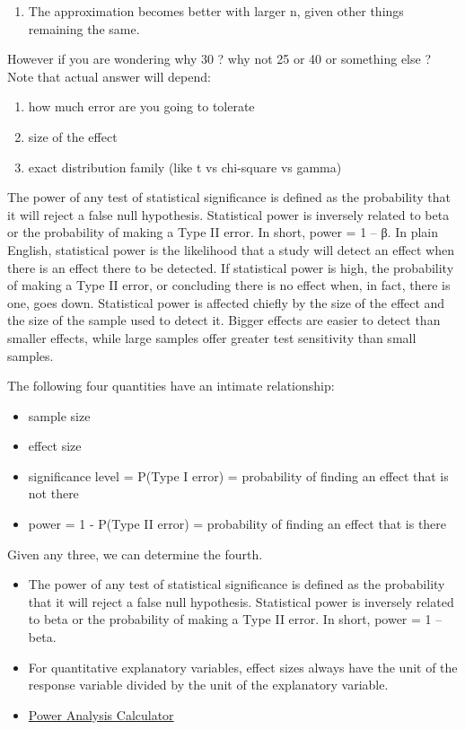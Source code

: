 \documentclass[]{book}
\providecommand{\tightlist}{%
  \setlength{\itemsep}{0pt}\setlength{\parskip}{0pt}}
\begin{document}
\begin{enumerate}
\def\labelenumi{\arabic{enumi})}
\setcounter{enumi}{1}
\tightlist
\item
  The approximation becomes better with larger n, given other things remaining the same.
\end{enumerate}

However if you are wondering why 30 ? why not 25 or 40 or something else ? Note that actual answer will depend:

\begin{enumerate}
\def\labelenumi{\arabic{enumi})}
\item
  how much error are you going to tolerate
\item
  size of the effect
\item
  exact distribution family (like t vs chi-square vs gamma)
\end{enumerate}

The power of any test of statistical significance is defined as the probability that it will reject a false null hypothesis. Statistical power is inversely related to beta or the probability of making a Type II error. In short, power = 1 -- β. In plain English, statistical power is the likelihood that a study will detect an effect when there is an effect there to be detected. If statistical power is high, the probability of making a Type II error, or concluding there is no effect when, in fact, there is one, goes down. Statistical power is affected chiefly by the size of the effect and the size of the sample used to detect it. Bigger effects are easier to detect than smaller effects, while large samples offer greater test sensitivity than small samples.

The following four quantities have an intimate relationship:

\begin{itemize}
\item
  sample size
\item
  effect size
\item
  significance level = P(Type I error) = probability of finding an effect that is not there
\item
  power = 1 - P(Type II error) = probability of finding an effect that is there
\end{itemize}

Given any three, we can determine the fourth.

\begin{itemize}
\item
  The power of any test of statistical significance is defined as the probability that it will reject a false null hypothesis. Statistical power is inversely related to beta or the probability of making a Type II error. In short, power = 1 -- beta.
\item
  For quantitative explanatory variables, effect sizes always have the unit of the response variable divided by the unit of the explanatory variable.
\item
  \href{http://www.evanmiller.org/ab-testing/sample-size.html}{Power Analysis Calculator}
\end{itemize}
\end{document}
